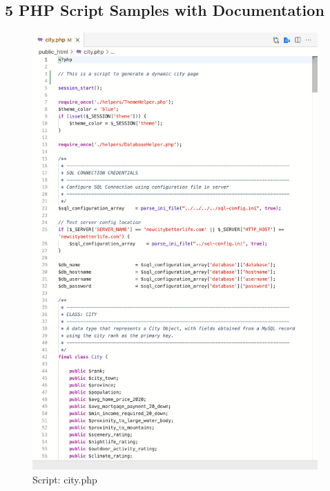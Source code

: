 \documentclass[12pt, letterpaper]{article}
\begin{document}
\newpage
\subsection*{5 PHP Script Samples with Documentation}


\begin{figure}[htbp]
	\centering
	\includegraphics[width=4.3in]{images/22-script-1.png}
	\caption{Script: city.php}
 \end{figure}

 
\end{document}
